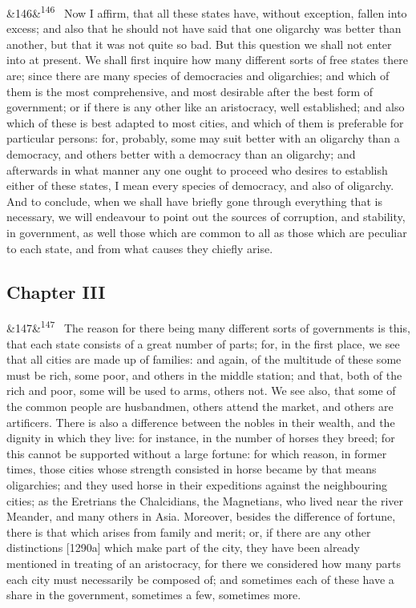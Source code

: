 \documentclass[12pt]{article}
\newcommand{\para}[1][]{\par\noindent\ifx&#1&\else\textsuperscript{\footnotesize #1}~\fi}
\begin{document}
\para[146] Now I affirm, that all these states have, without exception, fallen into excess; and also that he should not have said that one oligarchy was better than another, but that it was not quite so bad. But this question we shall not enter into at present. We shall first inquire how many different sorts of free states there are; since there are many species of democracies and oligarchies; and which of them is the most comprehensive, and most desirable after the best form of government; or if there is any other like an aristocracy, well established; and also which of these is best adapted to most cities, and which of them is preferable for particular persons: for, probably, some may suit better with an oligarchy than a democracy, and others better with a democracy than an oligarchy; and afterwards in what manner any one ought to proceed who desires to establish either of these states, I mean every species of democracy, and also of oligarchy. And to conclude, when we shall have briefly gone through everything that is necessary, we will endeavour to point out the sources of corruption, and stability, in government, as well those which are common to all as those which are peculiar to each state, and from what causes they chiefly arise.

\subsection*{Chapter III}

\para[147] The reason for there being many different sorts of governments is this, that each state consists of a great number of parts; for, in the first place, we see that all cities are made up of families: and again, of the multitude of these some must be rich, some poor, and others in the middle station; and that, both of the rich and poor, some will be used to arms, others not. We see also, that some of the common people are husbandmen, others attend the market, and others are artificers. There is also a difference between the nobles in their wealth, and the dignity in which they live: for instance, in the number of horses they breed; for this cannot be supported without a large fortune: for which reason, in former times, those cities whose strength consisted in horse became by that means oligarchies; and they used horse in their expeditions against the neighbouring cities; as the Eretrians the Chalcidians, the Magnetians, who lived near the river Meander, and many others in Asia. Moreover, besides the difference of fortune, there is that which arises from family and merit; or, if there are any other distinctions [1290a] which make part of the city, they have been already mentioned in treating of an aristocracy, for there we considered how many parts each city must necessarily be composed of; and sometimes each of these have a share in the government, sometimes a few, sometimes more.
\end{document}

